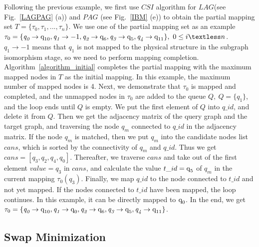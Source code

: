 \documentclass[runningheads]{llncs}
\begin{document}
	\begin{example}
		Following the previous example, we first use  $CSI$ algorithm for $LAG$(see Fig.~\ref{LAGPAG} (a)) and $PAG$ (see Fig.~\ref{IBM} (e)) to obtain the partial mapping set $T=\{\tau_{0},\tau_{1},...,\tau_{n}\}$. We use one of the partial mapping set as an example
$\tau_{0}=\{\textit{q}_\textit{0}\rightarrow \textup{q}_{\textup{10}},\textit{q}_\textit{1}\rightarrow -1,
	\textit{q}_\textit{2}\rightarrow \textup{q}_{\textup{6}},\textit{q}_\textit{3}\rightarrow \textup{q}_{\textup{5}},\textit{q}_\textit{4}\rightarrow \textup{q}_{\textup{11}}\}, \ 0 \le i \textless n$. 
	$\textit{q}_\textit{1}\rightarrow -1$ means that $\textit{q}_\textit{1}$ is not mapped to the physical structure in the subgraph isomorphism stage,	so we need to perform mapping completion. Algorithm~\ref{algorithm_initial} completes the partial mapping with the maximum mapped nodes in $T$ as the initial mapping. In this example, the maximum number of mapped nodes is 4. Next, we demonstrate that $\tau_{0}$ is mapped and completed, and the unmapped nodes in $\tau_{0}$ are added to the queue $Q, \ Q=\{\textit{q}_\textit{1}\}$, and the loop ends until $Q$ is empty. We put the first element of $Q$ into $q\_id$, and delete it from $Q$.  
	Then we get the adjacency matrix of the query graph and the target graph, and traversing the node $\textit{q}_\textit{m}$ connected to $q\_id$ in the adjacency matrix. If the node $\textit{q}_\textit{m}$ is matched, then we put $\textit{q}_\textit{m}$ into the candidate nodes list $cans$, which is sorted by the connectivity of $\textit{q}_\textit{m}$ and $q\_id$. Thus we get $cans=[\textit{q}_\textit{3},\textit{q}_\textit{2},\textit{q}_\textit{4},\textit{q}_\textit{0}]$.	Thereafter, we traverse $cans$ and take out of the first element $value=\textit{q}_\textit{3}$ in $cans$, and calculate the value $t\_id=\textup{q}_{\textup{5}}$ of $\textit{q}_\textit{m}$ in the current mapping $\tau_{0}(\textit{q}_\textit{3})$. Finally, we map $q\_id$ to the node connected to $t\_id$ and not yet mapped. If the nodes connected to $t\_id$ have been mapped, the loop continues. In this example, it can be directly mapped to $\textup{q}_{\textup{0}}$. In the end, we get $ \tau_{0}=\{\textit{q}_\textit{0}\rightarrow  \textup{q}_{10},\textit{q}_\textit{1}\rightarrow \textup{q}_{0},	\textit{q}_\textit{2}\rightarrow  \textup{q}_{\textup{6}},\textit{q}_\textit{3}\rightarrow  \textup{q}_{\textup{5}},\textit{q}_\textit{4}\rightarrow  \textup{q}_{\textup{11}}\}$.
	\end{example}
\subsection{Swap Minimization}
\end{document}
